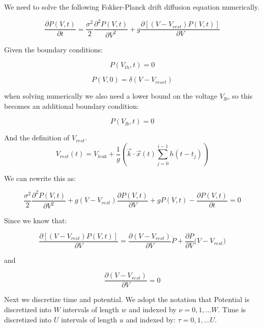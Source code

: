 \documentclass[10pt]{article}
\begin{document}
We need to solve the following Fokker-Planck drift diffusion equation
numerically.

\begin{equation}
    \frac{\partial P(V,t)}{\partial t} =
    \frac{\sigma^2}{2} \frac{\partial^2 P(V,t) } {\partial V^2} +
    g\frac{\partial[(V-V_{rest})P(V,t)]}{\partial V}
\end{equation}

Given the boundary conditions:
 
\begin{equation}
    P(V_{th},t) = 0
\end{equation}

\begin{equation}
    P(V,0) = \delta(V-V_{reset})
\end{equation}

when solving numerically we also need a lower bound on the
voltage $V_{lb}$, so this becomes an additional boundary condition:

\begin{equation}
    P(V_{lb},t) = 0 
\end{equation}


And the definition of $V_{rest}$.
\begin{equation}
    V_{rest}(t) = V_{leak} + \frac{1}{g}(\vec{k} \cdot \vec{x}(t)
    \sum_{j=0}^{i-1}h(t-t_j))
\end{equation}


We can rewrite this as:

\begin{equation}
    \frac{\sigma^2}{2} \frac{\partial^2 P(V,t) } {\partial V^2} +
    g(V-V_{rest})\frac{\partial P(V,t)}{\partial V} +
    gP(V,t) -
    \frac{\partial P(V,t)}{\partial t} = 
    0
\end{equation}

Since we know that:

\begin{equation}
    \frac{\partial[(V-V_{rest})P(V,t)]}{\partial V} =
    \frac{\partial (V-V_{rest})}{\partial V} \dot P +
    \frac{\partial P}{\partial V} \dot (V-V_{rest})
\end{equation}

and

\begin{equation}
    \frac{\partial (V-V_{rest})}{\partial V} = 0 
\end{equation}


Next we discretize time and potential. We adopt the notation that
Potential is discretized into $W$ intervals of length $w$ and indexed
by $\nu= 0,1, \dots W $.  Time is discretized  into $U$ intervals of
length $u$ and indexed by: $\tau= 0,1, \dots U $.
\end{document}
